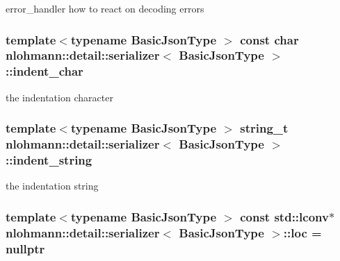 error\+\_\+handler how to react on decoding errors 

\subsubsection[{\texorpdfstring{indent\+\_\+char}{indent_char}}]{\setlength{\rightskip}{0pt plus 5cm}template$<$typename Basic\+Json\+Type $>$ const char {\bf nlohmann\+::detail\+::serializer}$<$ Basic\+Json\+Type $>$\+::indent\+\_\+char\hspace{0.3cm}{\ttfamily [private]}}\hypertarget{classnlohmann_1_1detail_1_1serializer_a9a55e6b028d09676fe35aefa0c72ea5b}{}\label{classnlohmann_1_1detail_1_1serializer_a9a55e6b028d09676fe35aefa0c72ea5b}


the indentation character 

\subsubsection[{\texorpdfstring{indent\+\_\+string}{indent_string}}]{\setlength{\rightskip}{0pt plus 5cm}template$<$typename Basic\+Json\+Type $>$ {\bf string\+\_\+t} {\bf nlohmann\+::detail\+::serializer}$<$ Basic\+Json\+Type $>$\+::indent\+\_\+string\hspace{0.3cm}{\ttfamily [private]}}\hypertarget{classnlohmann_1_1detail_1_1serializer_ae9268a10d88a5526e32735a55a132fc6}{}\label{classnlohmann_1_1detail_1_1serializer_ae9268a10d88a5526e32735a55a132fc6}


the indentation string 

\subsubsection[{\texorpdfstring{loc}{loc}}]{\setlength{\rightskip}{0pt plus 5cm}template$<$typename Basic\+Json\+Type $>$ const std\+::lconv$\ast$ {\bf nlohmann\+::detail\+::serializer}$<$ Basic\+Json\+Type $>$\+::loc = nullptr\hspace{0.3cm}{\ttfamily [private]}}\hypertarget{classnlohmann_1_1detail_1_1serializer_a1952945b7652afb59d3903cc8457a589}{}\label{classnlohmann_1_1detail_1_1serializer_a1952945b7652afb59d3903cc8457a589}


